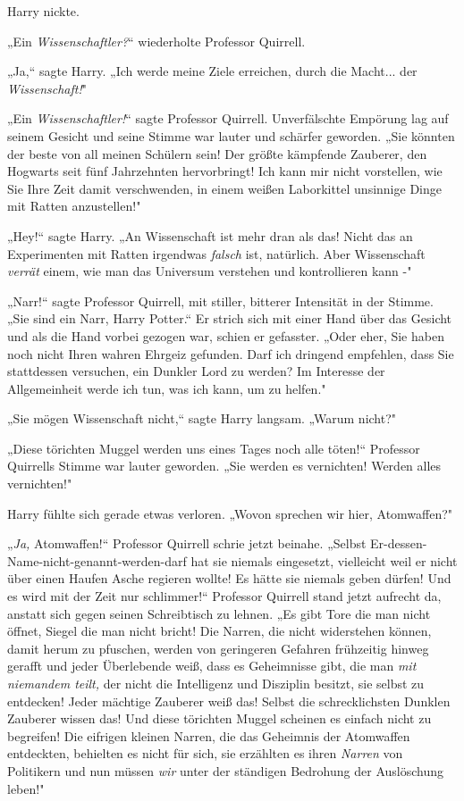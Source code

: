 {Harry nickte.

„Ein \emph{Wissenschaftler?}“ wiederholte Professor Quirrell.

„Ja,“ sagte Harry. „Ich werde meine Ziele erreichen, durch die Macht... der \emph{Wissenschaft!}"

„Ein \emph{Wissenschaftler!}“ sagte Professor Quirrell. Unverfälschte Empörung lag auf seinem Gesicht und seine Stimme war lauter und schärfer geworden. „Sie könnten der beste von all meinen Schülern sein! Der größte kämpfende Zauberer, den Hogwarts seit fünf Jahrzehnten hervorbringt! Ich kann mir nicht vorstellen, wie Sie Ihre Zeit damit verschwenden, in einem weißen Laborkittel unsinnige Dinge mit Ratten anzustellen!"

„Hey!“ sagte Harry. „An Wissenschaft ist mehr dran als das! Nicht das an Experimenten mit Ratten irgendwas \emph{falsch} ist, natürlich. Aber Wissenschaft \emph{verrät} einem, wie man das Universum verstehen und kontrollieren kann -"

„Narr!“ sagte Professor Quirrell, mit stiller, bitterer Intensität in der Stimme. „Sie sind ein Narr, Harry Potter.“ Er strich sich mit einer Hand über das Gesicht und als die Hand vorbei gezogen war, schien er gefasster. „Oder eher, Sie haben noch nicht Ihren wahren Ehrgeiz gefunden. Darf ich dringend empfehlen, dass Sie stattdessen versuchen, ein Dunkler Lord zu werden? Im Interesse der Allgemeinheit werde ich tun, was ich kann, um zu helfen."

„Sie mögen Wissenschaft nicht,“ sagte Harry langsam. „Warum nicht?"

„Diese törichten Muggel werden uns eines Tages noch alle töten!“ Professor Quirrells Stimme war lauter geworden. „Sie werden es vernichten! Werden alles vernichten!"

Harry fühlte sich gerade etwas verloren. „Wovon sprechen wir hier, Atomwaffen?"

„\emph{Ja,} Atomwaffen!“ Professor Quirrell schrie jetzt beinahe. „Selbst Er-dessen-Name-nicht-genannt-werden-darf hat sie niemals eingesetzt, vielleicht weil er nicht über einen Haufen Asche regieren wollte! Es hätte sie niemals geben dürfen! Und es wird mit der Zeit nur schlimmer!“ Professor Quirrell stand jetzt aufrecht da, anstatt sich gegen seinen Schreibtisch zu lehnen. „Es gibt Tore die man nicht öffnet, Siegel die man nicht bricht! Die Narren, die nicht widerstehen können, damit herum zu pfuschen, werden von geringeren Gefahren frühzeitig hinweg gerafft und jeder Überlebende weiß, dass es Geheimnisse gibt, die man \emph{mit niemandem teilt,} der nicht die Intelligenz und Disziplin besitzt, sie selbst zu entdecken! Jeder mächtige Zauberer weiß das! Selbst die schrecklichsten Dunklen Zauberer wissen das! Und diese törichten Muggel scheinen es einfach nicht zu begreifen! Die eifrigen kleinen Narren, die das Geheimnis der Atomwaffen entdeckten, behielten es nicht für sich, sie erzählten es ihren \emph{Narren} von Politikern und nun müssen \emph{wir} unter der ständigen Bedrohung der Auslöschung leben!"

}
